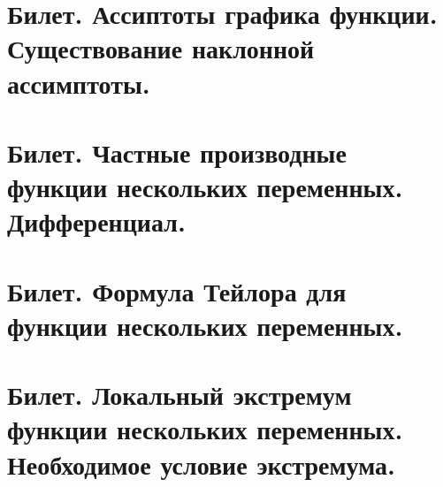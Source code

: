 \documentclass[12pt]{article}
\begin{document}
	
	
	\section{Билет. Ассиптоты графика функции. Существование наклонной ассимптоты.}
	
	
	
	
	
	\section{Билет. Частные производные функции нескольких переменных. Дифференциал.}
	
	
	
	
	\section{Билет. Формула Тейлора для функции нескольких переменных.}
	
	
	

	
	\section{Билет. Локальный экстремум функции нескольких переменных. Необходимое условие экстремума.}
	
	
	
	
	
	
	
	
	
	
	
	
	
	
	
	
	
	
	
	
	
\end{document}
